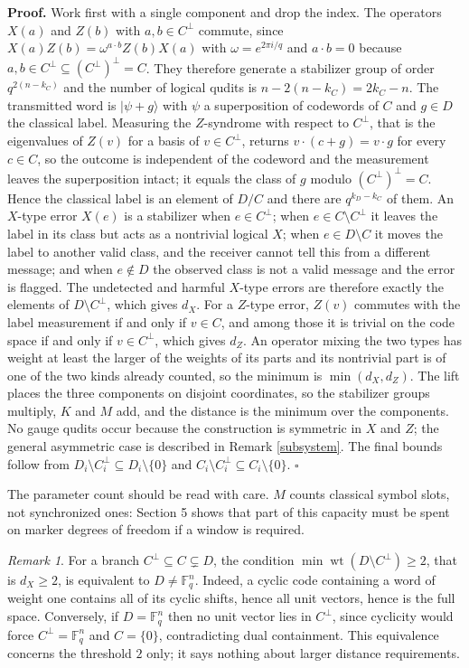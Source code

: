 \documentclass[11pt,reqno]{amsart}
\theoremstyle{definition}
\theoremstyle{remark}
\newtheorem{remark}[theorem]{Remark}
\newcommand{\F}{\mathbb{F}}
\newcommand{\wt}{\operatorname{wt}}
\begin{document}
\textbf{Proof.} Work first with a single component and drop the index. The operators $X(a)$ and $Z(b)$ with $a,b\in C^\perp$ commute, since $X(a)Z(b)=\omega^{a\cdot b}Z(b)X(a)$ with $\omega=e^{2\pi i/q}$ and $a\cdot b=0$ because $a,b\in C^\perp\subseteq(C^\perp)^\perp=C$. They therefore generate a stabilizer group of order $q^{2(n-k_C)}$ and the number of logical qudits is $n-2(n-k_C)=2k_C-n$. The transmitted word is $|\psi+g\rangle$ with $\psi$ a superposition of codewords of $C$ and $g\in D$ the classical label. Measuring the $Z$-syndrome with respect to $C^\perp$, that is the eigenvalues of $Z(v)$ for a basis of $v\in C^\perp$, returns $v\cdot(c+g)=v\cdot g$ for every $c\in C$, so the outcome is independent of the codeword and the measurement leaves the superposition intact; it equals the class of $g$ modulo $(C^\perp)^\perp=C$. Hence the classical label is an element of $D/C$ and there are $q^{k_D-k_C}$ of them. An $X$-type error $X(e)$ is a stabilizer when $e\in C^\perp$; when $e\in C\setminus C^\perp$ it leaves the label in its class but acts as a nontrivial logical $X$; when $e\in D\setminus C$ it moves the label to another valid class, and the receiver cannot tell this from a different message; and when $e\notin D$ the observed class is not a valid message and the error is flagged. The undetected and harmful $X$-type errors are therefore exactly the elements of $D\setminus C^\perp$, which gives $d_X$. For a $Z$-type error, $Z(v)$ commutes with the label measurement if and only if $v\in C$, and among those it is trivial on the code space if and only if $v\in C^\perp$, which gives $d_Z$. An operator mixing the two types has weight at least the larger of the weights of its parts and its nontrivial part is of one of the two kinds already counted, so the minimum is $\min(d_X,d_Z)$. The lift places the three components on disjoint coordinates, so the stabilizer groups multiply, $K$ and $M$ add, and the distance is the minimum over the components. No gauge qudits occur because the construction is symmetric in $X$ and $Z$; the general asymmetric case is described in Remark \ref{subsystem}. The final bounds follow from $D_i\setminus C_i^\perp\subseteq D_i\setminus\{0\}$ and $C_i\setminus C_i^\perp\subseteq C_i\setminus\{0\}$. $\square$


The parameter count should be read with care. $M$ counts classical symbol slots, not synchronized ones: Section 5 shows that part of this capacity must be spent on marker degrees of freedom if a window is required.


\begin{remark}\label{properD}
For a branch $C^\perp\subseteq C\subsetneq D$, the condition $\min\wt(D\setminus C^\perp)\ge2$, that is $d_X\ge2$, is equivalent to $D\neq\F_q^n$. Indeed, a cyclic code containing a word of weight one contains all of its cyclic shifts, hence all unit vectors, hence is the full space. Conversely, if $D=\F_q^n$ then no unit vector lies in $C^\perp$, since cyclicity would force $C^\perp=\F_q^n$ and $C=\{0\}$, contradicting dual containment. This equivalence concerns the threshold $2$ only; it says nothing about larger distance requirements.
\end{remark}
\end{document}
